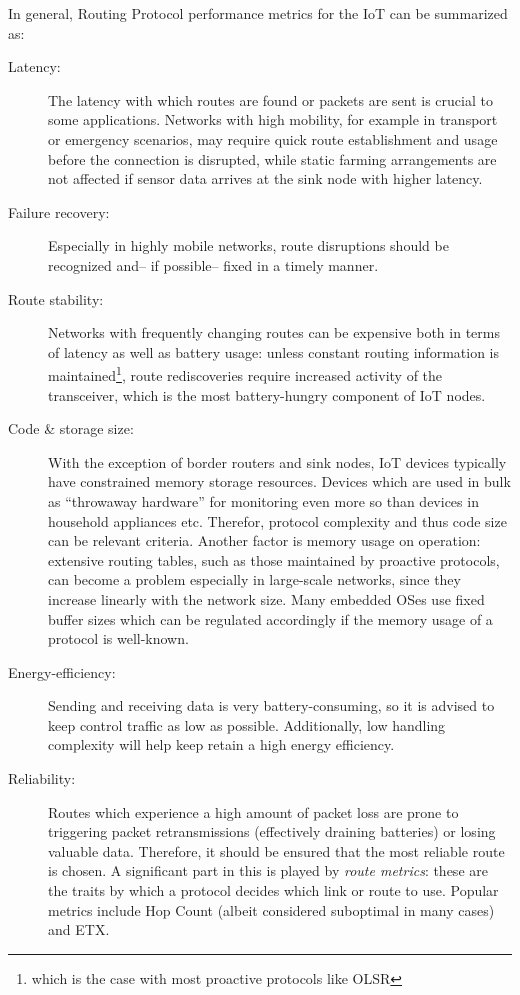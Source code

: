 \documentclass{acm_proc_article-sp}
\begin{document}
In general, Routing Protocol performance metrics for the IoT can be summarized as:
\begin{description}
\item[Latency:] The latency with which routes are found or packets are sent is crucial to some applications. Networks with high mobility, for example in transport or emergency scenarios, may require quick route establishment and usage before the connection is disrupted, while static farming arrangements are not affected if sensor data arrives at the sink node with higher latency.
\item[Failure recovery:] Especially in highly mobile networks, route disruptions should be recognized and-- if possible-- fixed in a timely manner.
\item[Route stability:] Networks with frequently changing routes can be expensive both in terms of latency as well as battery usage: unless constant routing information is maintained\footnote{ which is the case with most proactive protocols like OLSR\cite{RFC-3626}}, route rediscoveries require increased activity of the transceiver, which is the most battery-hungry component of IoT nodes.
\item[Code \& storage size:] With the exception of border routers and sink nodes, IoT devices typically have constrained memory storage resources. Devices which are used in bulk as ``throwaway hardware'' for monitoring even more so than devices in household appliances etc. Therefor, protocol complexity and thus code size can be relevant criteria. Another factor is memory usage on operation: extensive routing tables, such as those maintained by proactive protocols, can become a problem especially in large-scale networks, since they increase linearly with the network size. Many embedded OSes use fixed buffer sizes which can be regulated accordingly if the memory usage of a protocol is well-known.
\newpage
\item[Energy-efficiency:] Sending and receiving data is very battery-consuming, so it is advised to keep control traffic as low as possible. Additionally, low handling complexity will help keep retain a high energy efficiency.
\item[Reliability:] Routes which experience a high amount of packet loss are prone to triggering packet retransmissions (effectively draining batteries) or losing valuable data. Therefore, it should be ensured that the most reliable route is chosen. A significant part in this is played by \emph{route metrics}: these are the traits by which a protocol decides which link or route to use. Popular metrics include Hop Count (albeit considered suboptimal in many cases) and \gls{ETX}.\end{description}
\end{document}
